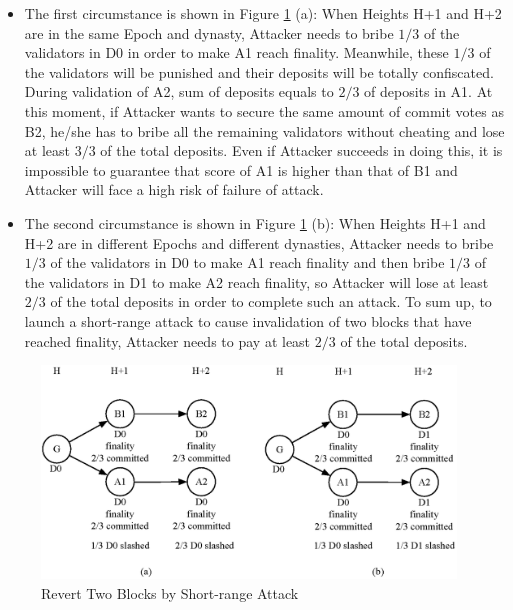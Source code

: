 \begin{itemize}
\item The first circumstance is shown in Figure \ref{fig:revert2} (a): When Heights H+1 and H+2 are in the same Epoch and dynasty, Attacker needs to bribe $1/3$ of the validators in D0 in order to make A1 reach finality. Meanwhile, these $1/3$ of the validators will be punished and their deposits will be totally confiscated. During validation of A2, sum of deposits equals to $2/3$ of deposits in A1. At this moment, if Attacker wants to secure the same amount of commit votes as B2, he/she has to bribe all the remaining validators without cheating and lose at least $3/3$ of the total deposits. Even if Attacker succeeds in doing this, it is impossible to guarantee that score of A1 is higher than that of B1 and Attacker will face a high risk of failure of attack.

\item The second circumstance is shown in Figure \ref{fig:revert2} (b): When Heights H+1 and H+2 are in different Epochs and different dynasties, Attacker needs to bribe $1/3$ of the validators in D0 to make A1 reach finality and then bribe $1/3$ of the validators in D1 to make A2 reach finality, so Attacker will lose at least $2/3$ of the total deposits in order to complete such an attack. To sum up, to launch a short-range attack to cause invalidation of two blocks that have reached finality, Attacker needs to pay at least $2/3$ of the total deposits.
\end{itemize}

\begin{figure}[h]
\centering
\includegraphics[width=11cm]{./figs/revert2}
\caption{Revert Two Blocks by Short-range Attack}
\label{fig:revert2}
\end{figure}

